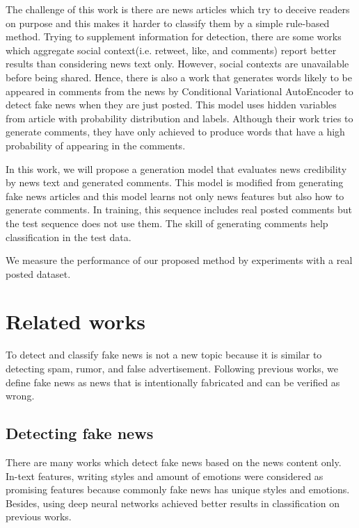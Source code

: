 \documentclass[conference]{IEEEtran}
\begin{document}
The challenge of this work is there are news articles which try to deceive readers on purpose
and this makes it harder to classify them by a simple rule-based method.
Trying to supplement information for detection,
there are some works which aggregate social context(i.e. retweet, like, and comments)
report better results than considering news text only\cite{Guo:2018:RDH:3269206.3271709}.
However, social contexts are unavailable before being shared.
Hence, there is also a work that generates words likely to be appeared in comments from the news by Conditional Variational AutoEncoder to detect fake news when they are just posted\cite{ijcai2018-533}.
This model uses hidden variables from article with probability distribution and labels.
Although their work tries to generate comments, they have only achieved to produce words that have a high probability of appearing in the comments.

In this work, we will propose a generation model that evaluates news credibility by news text and generated comments.
This model is modified from generating fake news articles\cite{NIPS2019_9106} and this model learns not only news features but also how to generate comments.
In training, this sequence includes real posted comments but the test sequence does not use them.
The skill of generating comments help classification in the test data.

We measure the performance of our proposed method by experiments with a real posted dataset.


\section{Related works}
To detect and classify fake news is not a new topic because it is similar to detecting spam\cite{shen2017discovering}, rumor\cite{7023340}, and false advertisement\cite{Huang:2017:DFO:3041021.3054233}.
Following previous works\cite{Shu:2017:FND:3137597.3137600,Ruchansky:2017:CHD:3132847.3132877,Wang:2018:EEA:3219819.3219903},
we define fake news as news that is intentionally fabricated and can be verified as wrong.

\subsection{Detecting fake news}
There are many works which detect fake news based on the news content only.
In-text features, writing styles\cite{DBLP:journals/corr/PotthastKRBS17} and amount of emotions\cite{DBLP:journals/corr/abs-1903-01728}
were considered as promising features because commonly fake news has unique styles and emotions.
Besides, using deep neural networks achieved better results in classification on previous works\cite{wang-2017-liar,karimi-tang-2019-learning,karimi-etal-2018-multi}.
\end{document}
